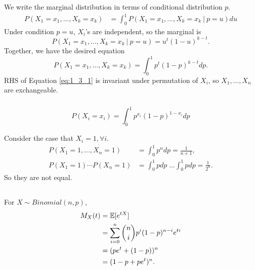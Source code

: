 \subsubsection{} %

We write the marginal distribution in terms of conditional distribution \wrt $p$.
\begin{align}
    P(X_1=x_1,\dots,X_k=x_k)
        &= \int_0^1 P(X_1=x_1,\dots,X_k=x_k~|~p=u) du
\end{align}
Under condition $p=u$, $X_i$'s are independent,
so the marginal is
\begin{equation}
    P(X_1=x_1,\dots,X_k=x_k~|~p=u) = u^t(1-u)^{k-t}.
\end{equation}
Together, we have the desired equation
\begin{equation} \label{eq:1_3_1}
    P(X_1=x_1,\dots,X_k=x_k) = \int_0^1 p^t(1-p)^{k-t}dp.
\end{equation}
RHS of Equation \eqref{eq:1_3_1} is invariant under permutation of $X_i$,
so $X_1,\dots,X_n$ are exchangeable.

\subsubsection{} %

\begin{equation}
    P(X_i=x_i) = \int_0^1 p^{x_i}(1-p)^{1-x_i} dp
\end{equation}

Consider the case that $X_i=1, \forall i$.
\begin{align}
    P(X_1=1,\dots,X_n=1) &= \int_0^1 p^n dp = \frac{1}{n+1}, \\
    P(X_1=1)\cdots P(X_n=1) &= \int_0^1 p dp\; \dots  \int_0^1 p dp = \frac{1}{2^n}.
\end{align}
So they are not equal.


\subsection{} %

\subsubsection{} %

For $X\sim Binomial(n,p)$,
\begin{align}
    M_X(t)
        &= \mathbb{E}[e^{tX}] \\
        &= \sum_{i=0}^n \binom{n}{i}p^i(1-p)^{n-i}e^{ti} \\
        &= (pe^t + (1-p))^n \\
        &= (1-p+pe^t)^n.
\end{align}

